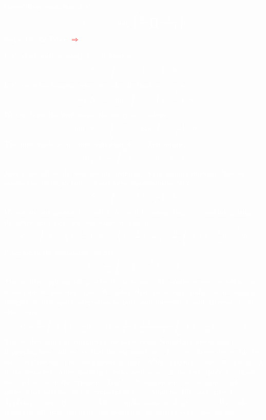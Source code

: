 \documentclass{article}
\title{}
\begin{document}
\maketitle
\pagecolor{black}
\textcolor{white}{
\begin{center}
Gauss' Representation of $\Gamma(s)$
$$\Gamma(s) = \lim_{n \to \infty} \left(\frac{n^s}{s} \prod_{k=1}^{n} \frac{k}{s+k}  \right)$$
Swipe For EZ Proof \textcolor{red}{$\Rightarrow$}
\end{center}
\newpage
Let's start with an integral $S_n$ defined as
$$ S_n = \int_0^n t^{s-1} \left( 1 - \frac{t}{n} \right)^n \,dt $$
Let's see what happens when we take the limit as $n \to \infty$
$$ \lim_{n \to \infty} S_n = \lim_{n\to \infty} \int_0^n t^{s-1} \left(1- \frac{t}{n} \right)^n \,dt $$
We can bring the limit inside the integral as follows
$$ \lim_{n\to \infty} S_n = \int_0^{\infty} t^{s-1} \lim_{n\to \infty} \left( 1- \frac{t}{n} \right)^n \,dt $$
The limit inside is the limit definition of $e^{-t}$, This means
$$ \lim_{n \to \infty} S_n = \int_0^{\infty} t^{s-1} e^{-t} \,dt = \Gamma(s) $$
Notice how all we did was use the definition of the gamma function. \medskip{} \newline \medskip{}  Now we proceed by trying to find a closed form representation of $S_n$.
$$S_n = \int_0^n t^{s-1} \left( 1- \frac{t}{n} \right)^n \,dt $$
We can use integration by parts here, we'll be integrating $t^{s-1}$ and integrating the other term. Let's just see where it takes us
\newpage
$$S_n = \int_0^n t^{s-1} \left( 1- \frac{t}{n} \right)^n \,dt = \Bigg[\left( 1 -\frac{t}{n}\right)^n \frac{t^s}{s}\Bigg]_0^n + \frac{n}{ns} \int_0^n t^s \left( 1 - \frac{t}{n} \right)^{n-1} \,dt $$
Plugging in the boundaries, we get
$$S_n = \frac{n}{ns} \int_0^n t^s \left( 1 - \frac{t}{n} \right)^{n-1} \,dt$$
This is after applying integration by parts once. My spidey senses are telling me to do what we just did, again. We notice that this is very similar to the original integral, so let's apply integration by parts and integrate $t^s$ and differentiate the other term
$$S_n = \frac{n}{ns}\int_0^n t^s \left( 1- \frac{t}{n} \right)^{n-1} \,dt = \frac{n}{ns} \times \frac{(n-1)}{n(s+1)} \int_0^n \left( 1 - \frac{t}{n} \right)^{n-2} t^{s+1} \,dt $$
This is after applying integration by parts twice. Something pretty cool is happening here and we see that the exponent on $(1 -t/n)$ keeps decreasing by one everytime we apply integration by parts. After applying it once, we had $n-1$ in the exponent. After applying it twice we had $n-2$. So if we apply it $n$ times we'd get $n-n$ in the exponent. That's 0 !(exclamation, not factorial). Let's notice what happens to the exponent of $t^{s-1}$. Applying IBP once gives $t^s$. Applying it twice gives $t^{s+1}$. After $n$ applications we'd get $t^{s+n-1}$. We could prove this all using induction but assuming the pattern continues, we get
}
\end{document}
